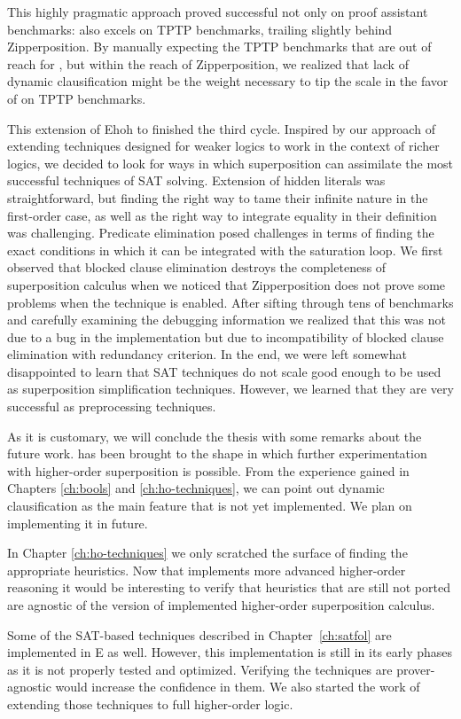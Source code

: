 This highly pragmatic approach proved successful not only on proof assistant
benchmarks: \ehohii{} also excels on TPTP benchmarks, trailing slightly behind
Zipperposition. By manually expecting the TPTP benchmarks that are out of reach
for \ehohii{}, but within the reach of Zipperposition, we realized that lack of
dynamic clausification might be the weight necessary to tip the scale in the
favor of \ehohii{} on TPTP benchmarks.

This extension of Ehoh to \ehohii{} finished the third cycle. Inspired by our
approach of extending techniques designed for weaker logics to work in the
context of richer logics, we decided to look for ways in which superposition can
assimilate the most successful techniques of SAT solving. Extension of hidden
literals was straightforward, but finding the right way to tame their infinite
nature in the first-order case, as well as the right way to integrate equality
in their definition was challenging. Predicate elimination posed challenges in
terms of finding the exact conditions in which it can be integrated with the
saturation loop. We first observed that blocked clause elimination destroys the
completeness of superposition calculus when we noticed that Zipperposition does
not prove some problems when the technique is enabled. After sifting through tens of
benchmarks and carefully examining the debugging information we realized that
this was not due to a bug in the implementation but due to incompatibility of
blocked clause elimination with redundancy criterion. In the end, we were left
somewhat disappointed to learn that SAT techniques do not scale good enough to be used
as superposition simplification techniques. However, we learned that they are
very successful as preprocessing techniques.

As it is customary, we will conclude the thesis with some remarks about the future work. \ehohii{} has been brought to the shape
in which further experimentation with higher-order superposition is possible.
From the experience gained in Chapters \ref{ch:bools} and
\ref{ch:ho-techniques}, we can point out dynamic clausification as the main
feature that is not yet implemented. We plan on implementing it in future.

In Chapter \ref{ch:ho-techniques} we only scratched the surface of finding the
appropriate heuristics. Now that \ehohii{} implements more advanced higher-order
reasoning it would be interesting to verify that heuristics that are still not ported are agnostic of
the version of implemented higher-order superposition calculus. 

Some of the SAT-based techniques described in Chapter~\ref{ch:satfol} are
implemented in E as well. However, this implementation is still in its early
phases as it is not properly tested and optimized. Verifying the techniques are
prover-agnostic would increase the confidence in them. We also started the work of extending
those techniques to full higher-order logic.
